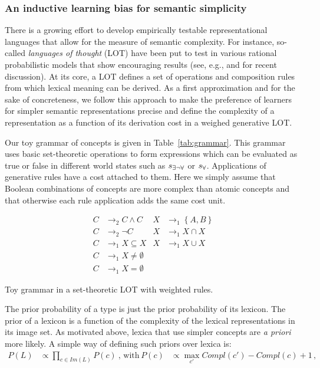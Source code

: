 \documentclass[a4paper]{article}
\newcommand{\set}[1]{\left\{#1\right\}}
\newcommand{\state}{\ensuremath{s}\xspace}		%
\newcommand{\mystate}[1]{\ensuremath{\state_{\text{#1}}}\xspace} %
\newcommand{\ssome}{\mystate{\ensuremath{\exists\neg\forall}}}
\newcommand{\sall}{\mystate{\ensuremath{\forall}}}
\begin{document}
\subsubsection{An inductive learning bias for semantic simplicity}
There is a growing effort to develop empirically  testable representational  languages that allow for the measure of semantic complexity. For instance, so-called {\em languages of thought} (LOT) have been put to test in various rational probabilistic models that show encouraging results (see, e.g., \citealt{katz+etal:2008, piantadosi+etal:underreview, piantadosi+etal:2012a} and \citealt{piantadosi+jacobs:2016} for recent discussion). At its core, a LOT defines a set of operations and composition rules from which lexical meaning can be derived. As a first approximation and for the sake of concreteness, we follow this approach to make the preference of learners for simpler semantic representations precise and define the complexity of a representation as a function of its derivation cost in a weighed generative LOT.

Our toy grammar of concepts is given in Table~\ref{tab:grammar}. This grammar uses basic set-theoretic operations to form expressions which can be evaluated as true or false in different world states such as $\ssome$ or $\sall$. Applications of generative  rules have a cost attached to them. Here we simply assume that Boolean combinations of concepts are more complex than atomic concepts and that otherwise each rule application adds the same cost unit.
\begin{table}
  \centering
  \begin{align*}
    C & \rightarrow_2 C \wedge C 
    & 
    X & \rightarrow_1 \set{A,B} \\
    C & \rightarrow_2 \neg C 
    & 
    X & \rightarrow_1 X \cap X \\
    C & \rightarrow_1 X \subseteq X
    & 
    X & \rightarrow_1 X \cup X \\
    C & \rightarrow_1 X \neq \emptyset \\
    C & \rightarrow_1 X = \emptyset     
  \end{align*}
  \caption{Toy grammar in a set-theoretic LOT with weighted rules.}
  \label{tab:grammar}
\end{table}


The prior probability of a type is just the prior probability of its lexicon. The prior of a lexicon is a function of the complexity of the lexical representations in its image set. As motivated above, lexica that use simpler concepts are \emph{a priori} more likely. A simple way of defining such priors over lexica is:
\begin{align*}
  P(L)  & \propto \prod_{c \in Im(L)} P(c)   \ \text{, with} & 
  P(c) & \propto \max_{c'}Compl(c') - Compl(c) + 1\,,
\end{align*}
\end{document}
